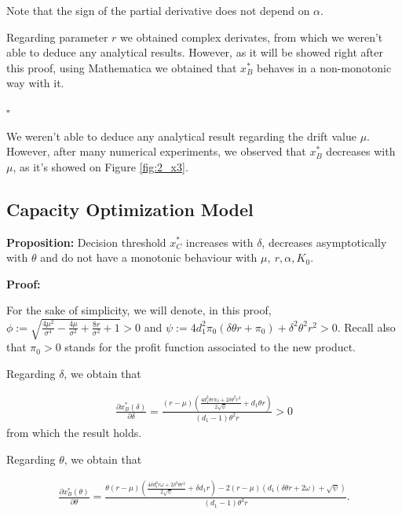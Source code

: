 Note that the sign of the partial derivative does not depend on $\alpha$.

Regarding parameter $r$ we obtained complex derivates, from which we weren't able to deduce any analytical results. However, as it will be showed right after this proof, using Mathematica we obtained that $x^*_B$ behaves in a non-monotonic way with it.

\begin{flushright}
	$\square$
\end{flushright}

We weren't able to deduce any analytical result regarding the drift value $\mu$. However, after many numerical experiments, we observed that $x_B^*$ decreases with $\mu$, as it's showed on Figure \ref{fig:2_x3}.


\subsection{Capacity Optimization Model}

\textbf{Proposition:}
Decision threshold $x^*_C$ increases with $\delta$, decreases asymptotically with $\theta$ and do not have a monotonic behaviour with $\mu, \ r, \alpha, K_0$.


\textbf{Proof:}

For the sake of simplicity, we will denote, in this proof, 
$\phi:=\sqrt{\frac{4 \mu ^2}{\sigma ^4}-\frac{4 \mu }{\sigma ^2}+\frac{8 r}{\sigma ^2}+1}>0$ and
$\psi:=4 d_1^2 \pi_0  (\delta  \theta  r+\pi_0 )+\delta ^2 \theta ^2 r^2>0$.
Recall also that $\pi_0>0$ stands for the profit function associated to the new product.

Regarding $\delta$, we obtain that

\begin{align*}
\frac{\partial x^*_B ( \delta ) }{\partial \delta}= \frac{(r-\mu ) \left(\frac{4 d_1^2 \theta  r \pi_0 +2 \delta  \theta ^2 r^2}{2 \sqrt{\psi }}+d_1 \theta  r\right)}{(d_1-1) \theta ^2 r}>0
\end{align*}
from which the result holds.

Regarding $\theta$, we obtain that

\begin{align*}
\frac{\partial x^*_B ( \theta) }{\partial \theta}= \frac{ \theta (r-\mu ) \left(\frac{4 \delta  d_1^2 r \omega +2 \delta ^2 \theta  r^2}{2 \sqrt{\psi }}+\delta  d_1 r\right)- 2 (r-\mu ) \left(d_1 (\delta  \theta  r+2 \omega )+\sqrt{\psi }\right)}{(d_1-1) \theta ^3 r}.
\end{align*}

